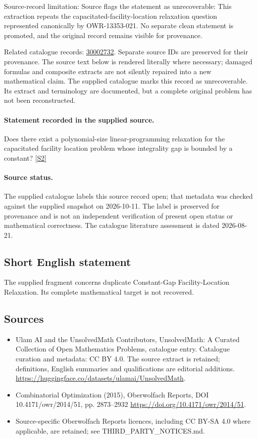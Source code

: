 \documentclass[11pt]{article}
\begin{document}
Source-record limitation: Source flags the statement as unrecoverable: This extraction repeats the capacitated-facility-location relaxation question represented canonically by OWR-13353-021. No separate clean statement is promoted, and the original record remains visible for provenance.

Related catalogue records: \href{https://mehmetmars7.github.io/Erdosproblems-llm-hunter/problem.html?type=open_problems&id=30002732}{30002732}. Separate source IDs are preserved for their provenance.
The source text below is rendered literally where necessary; damaged formulas and composite extracts are not silently repaired into a new mathematical claim.
The supplied catalogue marks this record as unrecoverable. Its extract and terminology are documented, but a complete original problem has not been reconstructed.
\paragraph{Statement recorded in the supplied source.}
Does there exist a polynomial-size linear-programming relaxation for the capacitated facility location problem whose integrality gap is bounded by a constant? \href{https://doi.org/10.4171/owr/2014/51}{[S2]}
\paragraph{Source status.}
The supplied catalogue labels this source record open; that metadata was checked against the supplied snapshot on 2026-10-11. The label is preserved for provenance and is not an independent verification of present open status or mathematical correctness. The catalogue literature assessment is dated 2026-08-21.
\subsection{Short English statement}
The supplied fragment concerns duplicate Constant-Gap Facility-Location Relaxation. Its complete mathematical target is not recovered.
\subsection{Sources}
\begin{itemize}
\item[S1] Ulam AI and the UnsolvedMath Contributors, UnsolvedMath: A Curated Collection of Open Mathematics Problems, catalogue entry. Catalogue curation and metadata: CC BY 4.0. The source extract is retained; definitions, English summaries and qualifications are editorial additions.
\url{https://huggingface.co/datasets/ulamai/UnsolvedMath}.
\item[S2] Combinatorial Optimization (2015), Oberwolfach Reports, DOI 10.4171/owr/2014/51, pp. 2873--2932
\url{https://doi.org/10.4171/owr/2014/51}.
\item Source-specific Oberwolfach Reports licences, including CC BY-SA 4.0 where applicable, are retained; see THIRD\_PARTY\_NOTICES.md.
\end{itemize}
\end{document}

